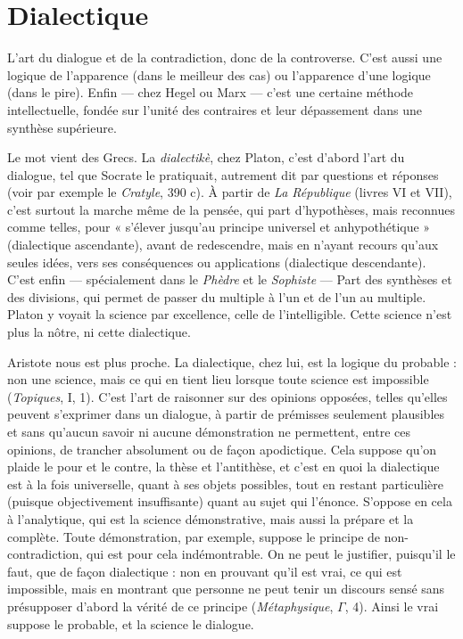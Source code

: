 \section{Dialectique}
L’art du dialogue et de la contradiction, donc de la controverse.
C’est aussi une logique de l’apparence (dans le
meilleur des cas) ou l’apparence d’une logique (dans le pire). Enfin — chez
Hegel ou Marx — c’est une certaine méthode intellectuelle, fondée sur l'unité
des contraires et leur dépassement dans une synthèse supérieure.

Le mot vient des Grecs. La {\it dialectikè}, chez Platon, c’est d’abord l’art du dialogue,
tel que Socrate le pratiquait, autrement dit par questions et réponses
(voir par exemple le {\it Cratyle}, 390 c). À partir de {\it La République} (livres VI
et VII), c’est surtout la marche même de la pensée, qui part d’hypothèses,
mais reconnues comme telles, pour « s'élever jusqu’au principe universel et
anhypothétique » (dialectique ascendante), avant de redescendre, mais en
n'ayant recours qu'aux seules idées, vers ses conséquences ou applications (dialectique
descendante). C’est enfin — spécialement dans le {\it Phèdre} et le {\it Sophiste} —
Part des synthèses et des divisions, qui permet de passer du multiple à l’un et
de l’un au multiple. Platon y voyait la science par excellence, celle de l’intelligible.
Cette science n’est plus la nôtre, ni cette dialectique.

Aristote nous est plus proche. La dialectique, chez lui, est la logique du
probable : non une science, mais ce qui en tient lieu lorsque toute science est
impossible ({\it Topiques}, I, 1). C’est l’art de raisonner sur des opinions opposées,
telles qu’elles peuvent s'exprimer dans un dialogue, à partir de prémisses seulement
plausibles et sans qu’aucun savoir ni aucune démonstration ne permettent,
entre ces opinions, de trancher absolument ou de façon apodictique. Cela
suppose qu’on plaide le pour et le contre, la thèse et l’antithèse, et c’est en quoi
la dialectique est à la fois universelle, quant à ses objets possibles, tout en restant
particulière (puisque objectivement insuffisante) quant au sujet qui
l’énonce. S’oppose en cela à l’analytique, qui est la science démonstrative, mais
aussi la prépare et la complète. Toute démonstration, par exemple, suppose le
principe de non-contradiction, qui est pour cela indémontrable. On ne peut le
justifier, puisqu'il le faut, que de façon dialectique : non en prouvant qu’il est
vrai, ce qui est impossible, mais en montrant que personne ne peut tenir un
discours sensé sans présupposer d’abord la vérité de ce principe ({\it Métaphysique},
$\Gamma$, 4). Ainsi le vrai suppose le probable, et la science le dialogue.

